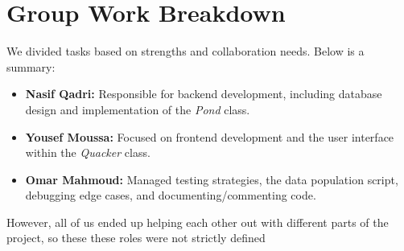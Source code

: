 \documentclass[letterpaper, 11pt]{article}
\begin{document}
\section{Group Work Breakdown}
We divided tasks based on strengths and collaboration needs. Below is a summary:

\begin{itemize}
    \item \textbf{Nasif Qadri:} Responsible for backend development, including database design and implementation of the \textit{Pond} class.
    \item \textbf{Yousef Moussa:} Focused on frontend development and the user interface within the \textit{Quacker} class.
    \item \textbf{Omar Mahmoud:} Managed testing strategies, the data population script, debugging edge cases, and documenting/commenting code.
\end{itemize}

\noindent However, all of us ended up helping each other out with different parts of the project, so these these roles were not strictly defined 
\end{document}
